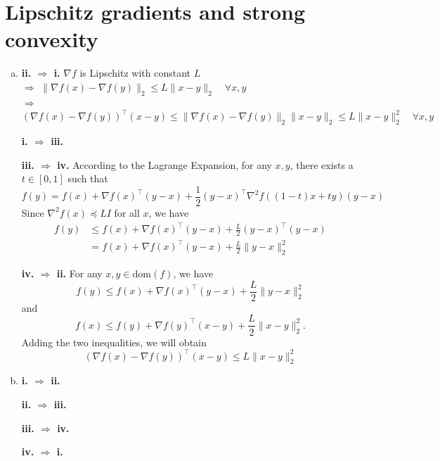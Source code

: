 \documentclass[12pt,letterpaper]{article}
\def\dom{\mathrm{dom}}
\begin{document}
	\section{Lipschitz gradients and strong convexity}
	\begin{enumerate}[(a)]
		\item 
		{\bf ii. $\Rightarrow$ i.}
		$\nabla f$ is Lipschitz with constant $L$ \\
		$\Rightarrow$ $\|\nabla f(x) - \nabla f(y)\|_2\le L\|x-y\|_2\quad\forall x, y$\\
		$\Rightarrow$ $(\nabla f(x) - \nabla f(y))^\top (x -y)\le \|\nabla f(x) - \nabla f(y)\|_2 \|x-y\|_2\le L\|x-y\|^2_2 \quad \forall x, y$
		
		{\bf i. $\Rightarrow$ iii.}
		
		{\bf iii. $\Rightarrow$ iv.} According to the Lagrange Expansion, for any $x,y$, there exists a $t\in[0, 1]$ such that \begin{equation}
		f(y)=f(x)+\nabla f(x)^\top(y-x) + \frac{1}{2}(y-x)^\top \nabla^2 f\left((1-t)x+ty\right) (y-x)
		\end{equation}
		Since $\nabla^2 f(x) \preceq LI$ for all $x$, we have
		\begin{align}
		f(y)&\le f(x)+\nabla f(x)^\top(y-x) + \frac{L}{2}(y-x)^\top (y-x) \nonumber\\
		&= f(x) + \nabla f(x)^\top (y-x) + \frac{L}{2} \|y-x\|_2^2
		\end{align}
		
		{\bf iv. $\Rightarrow$ ii.} For any $x, y \in \dom(f)$, we have
		\begin{equation}
		f(y)\le f(x) + \nabla f(x)^\top (y-x) + \frac{L}{2} \|y-x\|_2^2
		\end{equation}
		and
		\begin{equation}
		f(x)\le f(y) + \nabla f(y)^\top (x-y) + \frac{L}{2} \|x-y\|_2^2.
		\end{equation}
		Adding the two inequalities, we will obtain
		\begin{equation}
		(\nabla f(x) - \nabla f(y))^\top(x-y) \le L \|x-y\|_2^2
		\end{equation}
		
		\item
		{\bf i. $\Rightarrow$ ii.}
		
		{\bf ii. $\Rightarrow$ iii.}
		
		{\bf iii. $\Rightarrow$ iv.}
		
		{\bf iv. $\Rightarrow$ i.}
		 
	\end{enumerate}
	\newpage
\end{document}
